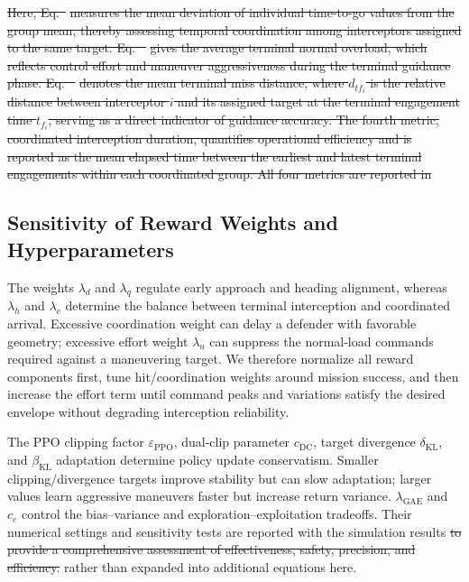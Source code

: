 \documentclass[lettersize,journal]{IEEEtran}
\providecommand{\DIFadd}[1]{{\protect\color{blue}#1}} %
\providecommand{\DIFdel}[1]{{\protect\color{red}\sout{#1}}}                      %
\providecommand{\DIFaddbegin}{} %
\providecommand{\DIFaddend}{} %
\providecommand{\DIFdelbegin}{} %
\providecommand{\DIFdelend}{} %
\newcommand{\DIFscaledelfig}{0.5}
\newlength{\DIFdelgraphicswidth} %
\newlength{\DIFdelgraphicsheight} %
\newcommand{\DIFaddincludegraphics}[2][]{{\color{blue}\fbox{\DIFOincludegraphics[#1]{#2}}}} %
\newcommand{\DIFdelincludegraphics}[2][]{%
\sbox{\DIFdelgraphicsbox}{\DIFOincludegraphics[#1]{#2}}%
\settoboxwidth{\DIFdelgraphicswidth}{\DIFdelgraphicsbox} %
\settoboxtotalheight{\DIFdelgraphicsheight}{\DIFdelgraphicsbox} %
\scalebox{\DIFscaledelfig}{%
\parbox[b]{\DIFdelgraphicswidth}{\usebox{\DIFdelgraphicsbox}\\[-\baselineskip] \rule{\DIFdelgraphicswidth}{0em}}\llap{\resizebox{\DIFdelgraphicswidth}{\DIFdelgraphicsheight}{%
\setlength{\unitlength}{\DIFdelgraphicswidth}%
\begin{picture}(1,1)%
\thicklines\linethickness{2pt} %
{\color[rgb]{1,0,0}\put(0,0){\framebox(1,1){}}}%
{\color[rgb]{1,0,0}\put(0,0){\line( 1,1){1}}}%
{\color[rgb]{1,0,0}\put(0,1){\line(1,-1){1}}}%
\end{picture}%
}\hspace*{3pt}}} %
} %
\DeclareRobustCommand{\DIFaddbegin}{\DIFOaddbegin \let\includegraphics\DIFaddincludegraphics} %
\DeclareRobustCommand{\DIFaddend}{\DIFOaddend \let\includegraphics\DIFOincludegraphics} %
\DeclareRobustCommand{\DIFdelbegin}{\DIFOdelbegin \let\includegraphics\DIFdelincludegraphics} %
\DeclareRobustCommand{\DIFdelend}{\DIFOaddend \let\includegraphics\DIFOincludegraphics} %
\begin{document}
\DIFdelbegin \DIFdel{Here, Eq.~}%
\DIFdel{measures the mean deviation of individual time-to-go values from the group mean, thereby assessing temporal coordination among interceptors assigned to the same target. Eq.
~}%
\DIFdel{gives the average terminal normal overload, which reflects control effort and maneuver aggressiveness during the terminal guidance phase. Eq. ~}%
\DIFdel{denotes the mean terminal miss distance, where $d_{tf_i}$ is the relative distance between interceptor $i$ and its assigned target at the terminal engagement time $t_{f_i}$, serving as a direct indicator of guidance accuracy.
The fourth metric, coordinated interception duration, quantifies operational efficiency and is reported as the mean elapsed time between the earliest and latest terminal engagements within each coordinated group. All four metrics are reported in }\DIFdelend \DIFaddbegin \subsection{\DIFadd{Sensitivity of Reward Weights and Hyperparameters}}
\label{subsec:reward_sensitivity}

\DIFadd{The weights $\lambda_d$ and $\lambda_q$ regulate early approach and heading alignment, whereas
$\lambda_h$ and $\lambda_c$ determine the balance between terminal interception and coordinated
arrival. Excessive coordination weight can delay a defender with favorable geometry; excessive
effort weight $\lambda_u$ can suppress the normal-load commands required against a maneuvering
target. We therefore normalize all reward components first, tune hit/coordination weights around
mission success, and then increase the effort term until command peaks and variations satisfy
the desired envelope without degrading interception reliability.
}

\DIFadd{The PPO clipping factor $\varepsilon_{\mathrm{PPO}}$, dual-clip parameter $c_{\mathrm{DC}}$,
target divergence $\delta_{\mathrm{KL}}$, and $\beta_{\mathrm{KL}}$ adaptation determine policy
update conservatism. Smaller clipping/divergence targets improve stability but can slow
adaptation; larger values learn aggressive maneuvers faster but increase return variance.
$\lambda_{\mathrm{GAE}}$ and $c_e$ control the bias--variance and exploration--exploitation
tradeoffs. Their numerical settings and sensitivity tests are reported with }\DIFaddend the simulation
results \DIFdelbegin \DIFdel{to provide a comprehensive assessment of effectiveness, safety, precision, and efficiency.
}\DIFdelend \DIFaddbegin \DIFadd{rather than expanded into additional equations here.
}
\end{document}
